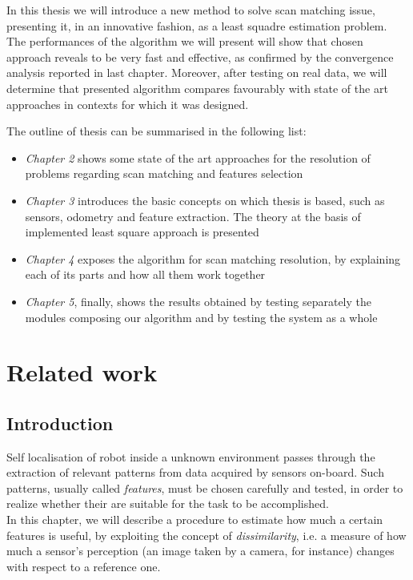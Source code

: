 \documentclass[a4paper, onecolumn]{report}
\begin{document}
In this thesis we will introduce a new method to solve scan matching issue, presenting it, in an innovative fashion, as a least squadre estimation problem. The performances of the algorithm we will present will show that chosen approach reveals to be very fast and effective, as confirmed by the convergence analysis reported in last chapter. Moreover, after testing on real data, we will determine that presented algorithm compares favourably with state of the art approaches in contexts for which it was designed.

The outline of thesis can be summarised in the following list:
\begin{itemize}
	\item{\emph{Chapter 2} shows some state of the art approaches for the resolution of problems regarding scan matching and features selection}
	\item{\emph{Chapter 3} introduces the basic concepts on which thesis is based, such as sensors, odometry and feature extraction. The theory at the basis of implemented least square approach is presented}
	\item{\emph{Chapter 4} exposes the algorithm for scan matching resolution, by explaining each of its parts and how all them work together}
	\item{\emph{Chapter 5}, finally, shows the results obtained by testing separately the modules composing our algorithm and by testing the system as a whole}
\end{itemize}

\chapter{Related work}
\section{Introduction}
Self localisation of robot inside a unknown environment passes through the extraction of relevant patterns from data acquired by sensors on-board. Such patterns, usually called \emph{features}, must be chosen carefully and tested, in order to realize whether their are suitable for the task to be accomplished. \\
In this chapter, we will describe a procedure to estimate how much a certain features is useful, by exploiting the concept of \emph{dissimilarity}, i.e. a measure of how much a sensor's perception (an image taken by a camera, for instance) changes with respect to a reference one.
\end{document}
